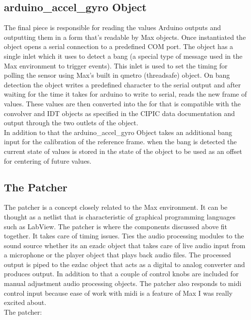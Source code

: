 \documentclass[a4paper,12pt,oneside]{article}
\begin{document}
\subsection{arduino\_accel\_gyro Object}

The final piece is responsible for reading the values Arduino outputs and outputting them in a form that's readable by Max objects. Once instantiated the object opens a serial connection to a predefined COM port. The object has a single inlet which it uses to detect a bang (a special type of message used in the Max environment to trigger events). This inlet is used to set the timing for polling the sensor using Max's built in qmetro  (threadsafe) object. On bang detection the object writes a predefined character to the serial output and after waiting for the time it takes for arduino to write to serial, reads the new frame of values. These values are then converted into the for that is compatible with the convolver and IDT objects as specified in the CIPIC data documentation and output through the two outlets of the object.\\ In addition to that the arduino\_accel\_gyro Object takes an additional bang input for the calibration of the reference frame. when the bang is detected the current state of values is stored in the state of the object to be used as an offset for centering of future values.

\subsection{The Patcher}

The patcher is a concept closely related to the Max environment. It can be thought as a netlist that is characteristic of graphical programming languages such as LabView. The patcher is where the components discussed above fit together. It takes care of timing issues. Ties the audio processing modules to the sound source whether its an ezadc object that takes care of live audio input from a microphone or the player object that plays back audio files. The processed output is piped to the ezdac object that acts as a digital to analog converter and produces output. In addition to that a couple of control knobs are included for manual adjustment audio processing objects. The patcher also responds to midi control input because ease of work with midi is a feature of Max I was really excited about.\\
The patcher:\\
\end{document}
